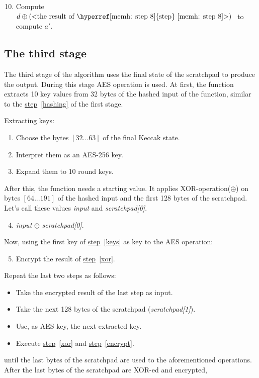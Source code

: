 \begin{enumerate}
  \setcounter{enumi}{9}
  \item Compute $d \oplus \mbox{(<the result of \hyperref[memh: step 8]{step}~\ref{memh: step 8}>) }$ to compute $a'$.
\end{enumerate}

\subsection{The third stage}
The third stage of the algorithm uses the final state of the scratchpad to produce the output. During this stage AES operation is used. At first, the function extracts 10 key values from 32 bytes of the hashed input of the function, similar to the \hyperref[hashing]{step}~\ref{hashing} of the first stage.

\noindent Extracting keys:
\begin{enumerate}
  \item Choose the bytes $[32...63]$ of the final Keccak state.
  \item Interpret them as an AES-256 key.
  \item \label{keys} Expand them to $10$ round keys.
\end{enumerate}
After this, the function needs a starting value. It applies XOR-operation($\oplus$) on bytes $[64...191]$ of the hashed input and the first 128 bytes of the scratchpad. Let's call these values \emph{input} and \emph{scratchpad[0]}.

\begin{enumerate}
  \setcounter{enumi}{3}
  \item \label{xor} \emph{input} $\oplus$ \emph{scratchpad[0]}.
\end{enumerate}
Now, using the first key of \hyperref[keys]{step}~\ref{keys} as key to the AES operation:

\begin{enumerate}
  \setcounter{enumi}{4}
  \item \label{encrypt} Encrypt the result of \hyperref[xor]{step}~\ref{xor}.
\end{enumerate}
Repeat the last two steps as follows:

\begin{itemize}
  \item Take the encrypted result of the last step as input.
  \item Take the next 128 bytes of the scratchpad (\emph{scratchpad[1]}).
  \item Use, as AES key, the next extracted key.
  \item Execute \hyperref[xor]{step}~\ref{xor} and \hyperref[encrypt]{step}~\ref{encrypt}.
\end{itemize}
until the last bytes of the scratchpad are used to the aforementioned operations. After the last bytes of the scratchpad are XOR-ed and encrypted,

